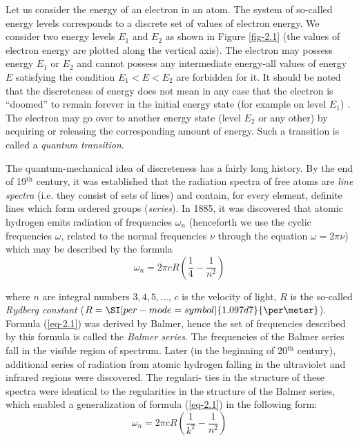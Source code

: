 \documentclass[a4paper,sfsidenotes,colorlinks=true]{tufte-book}
\numberwithin{equation}{section}
\numberwithin{figure}{section}
\begin{document}
Let us consider the energy of an electron in an atom. The system of
so-called energy levels corresponds to a discrete set of values of
electron energy. We consider two energy levels $E_{1}$ and $E_{2}$ as
shown in Figure \ref{fig-2.1} (the values of electron energy are
plotted along the vertical axis). The electron may possess energy
$E_{1}$ or $E_{2}$ and cannot possess any intermediate energy-all
values of energy $E$ satisfying the condition $E_{1} < E < E_{2}$ are
forbidden for it. It
should be noted that the discreteness of energy does not mean in any
case that the electron is ``doomed'' to remain forever in the initial
energy state (for example on level $E_{1}$) . The electron may go over to
another energy state (level $E_{2}$ or any other) by acquiring or releasing
the corresponding amount of energy. Such a transition is called a
\emph{quantum transition}.

The quantum-mechanical idea of discreteness has a fairly long
history. By the end of 19$^{\text{th}}$ century, it was established that the
radiation spectra of free atoms are \emph{line spectra} (i.e. they consist of
sets of lines) and contain, for every element, definite lines which
form ordered groups (\emph{series}). In 1885, it was discovered that atomic
hydrogen emits radiation of frequencies $\omega_{n}$ (henceforth we use the
cyclic frequencies $\omega$, related to the normal frequencies $\nu$ through the
equation $\omega = 2 \pi \nu$) which may be described by the formula
\begin{equation}%
\omega_{n} = 2 \pi c R \left( \frac{1}{4} - \frac{1}{n^{2}} \right)
\label{eq-2.1}
\end{equation}

where $n$ are integral numbers $3, 4, 5, \ldots$, $c$ is the velocity
of light, $R$ is the so-called \emph{Rydberg constant} ($R =
\SI[per-mode=symbol]{1.097d7}{\per\meter}$). Formula (\ref{eq-2.1}) was
derived by Balmer, hence the set of frequencies described by this
formula is called the \emph{Balmer series}. The frequencies of the Balmer
series fall in the visible region of spectrum. Later (in the beginning
of 20$^{\text{th}}$ century), additional series of radiation from atomic hydrogen
falling in the ultraviolet and infrared regions were discovered. The
regulari- ties in the structure of these spectra were identical to the
regularities in the structure of the Balmer series, which enabled a
generalization of formula (\ref{eq-2.1}) in the following form: 
\begin{equation}%
\omega_{n} = 2 \pi c R \left( \frac{1}{k^{2}} - \frac{1}{n^{2}} \right)
\label{eq-2.2}
\end{equation}
\end{document}
